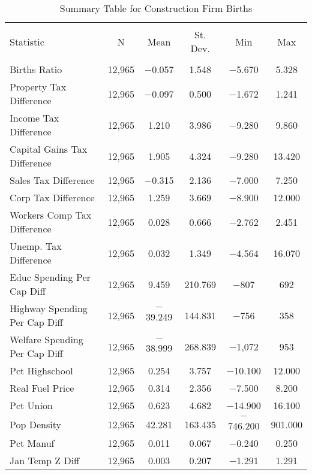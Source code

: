 
\begin{table}[!htbp] \centering 
  \caption{Summary Table for  Construction Firm Births} 
  \label{23summary} 
\begin{tabular}{@{\extracolsep{5pt}}lccccc} 
\\[-1.8ex]\hline 
\hline \\[-1.8ex] 
Statistic & \multicolumn{1}{c}{N} & \multicolumn{1}{c}{Mean} & \multicolumn{1}{c}{St. Dev.} & \multicolumn{1}{c}{Min} & \multicolumn{1}{c}{Max} \\ 
\hline \\[-1.8ex] 
Births Ratio & 12,965 & $-$0.057 & 1.548 & $-$5.670 & 5.328 \\ 
Property Tax Difference & 12,965 & $-$0.097 & 0.500 & $-$1.672 & 1.241 \\ 
Income Tax Difference & 12,965 & 1.210 & 3.986 & $-$9.280 & 9.860 \\ 
Capital Gains Tax Difference & 12,965 & 1.905 & 4.324 & $-$9.280 & 13.420 \\ 
Sales Tax Difference & 12,965 & $-$0.315 & 2.136 & $-$7.000 & 7.250 \\ 
Corp Tax Difference & 12,965 & 1.259 & 3.669 & $-$8.900 & 12.000 \\ 
Workers Comp Tax Difference & 12,965 & 0.028 & 0.666 & $-$2.762 & 2.451 \\ 
Unemp. Tax Difference & 12,965 & 0.032 & 1.349 & $-$4.564 & 16.070 \\ 
Educ Spending Per Cap Diff & 12,965 & 9.459 & 210.769 & $-$807 & 692 \\ 
Highway Spending Per Cap Diff & 12,965 & $-$39.249 & 144.831 & $-$756 & 358 \\ 
Welfare Spending Per Cap Diff & 12,965 & $-$38.999 & 268.839 & $-$1,072 & 953 \\ 
Pct Highschool & 12,965 & 0.254 & 3.757 & $-$10.100 & 12.000 \\ 
Real Fuel Price & 12,965 & 0.314 & 2.356 & $-$7.500 & 8.200 \\ 
Pct Union & 12,965 & 0.623 & 4.682 & $-$14.900 & 16.100 \\ 
Pop Density & 12,965 & 42.281 & 163.435 & $-$746.200 & 901.000 \\ 
Pct Manuf & 12,965 & 0.011 & 0.067 & $-$0.240 & 0.250 \\ 
Jan Temp Z Diff & 12,965 & 0.003 & 0.207 & $-$1.291 & 1.291 \\ 

\end{tabular}
\end{table}
